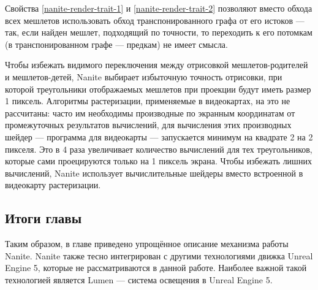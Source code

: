 Свойства \ref{nanite-render-trait-1} и \ref{nanite-render-trait-2} позволяют вместо обхода всех мешлетов использовать обход транспонированного графа от его истоков --- так, если найден мешлет, подходящий по точности, то переходить к его потомкам (в транспонированном графе --- предкам) не имеет смысла.

Чтобы избежать видимого переключения между отрисовкой мешлетов-родителей и мешлетов-детей, Nanite выбирает избыточную точность отрисовки, при которой треугольники отображаемых мешлетов при проекции будут иметь размер 1 пиксель.
Алгоритмы растеризации, применяемые в видеокартах, на это не рассчитаны: часто им необходимы производные по экранным координатам от промежуточных результатов вычислений, для вычисления этих производных шейдер --- программа для видеокарты --- запускается минимум на квадрате 2 на 2 пикселя.
Это в 4 раза увеличивает количество вычислений для тех треугольников, которые сами проецируются только на 1 пиксель экрана.
Чтобы избежать лишних вычислений, Nanite использует вычислительные шейдеры вместо встроенной в видеокарту растеризации.

\subsection*{Итоги главы}
Таким образом, в главе приведено упрощённое описание механизма работы Nanite.
Nanite также тесно интегрирован с другими технологиями движка Unreal Engine 5, которые не рассматриваются в данной работе.
Наиболее важной такой технологией является Lumen --- система освещения в Unreal Engine 5.
